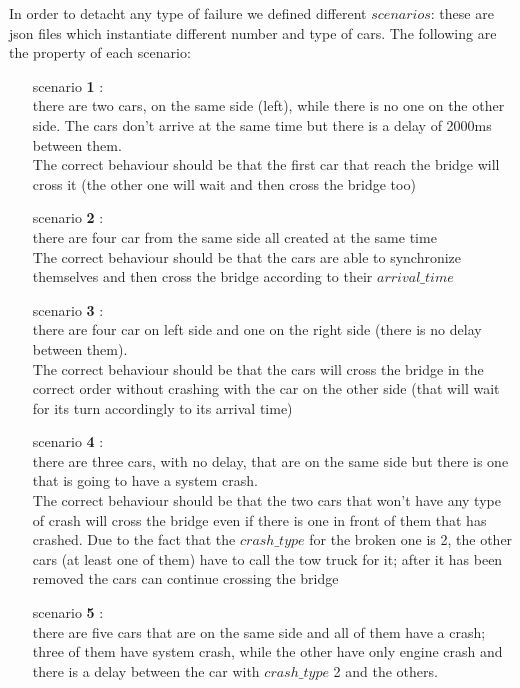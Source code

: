 In order to detacht any type of failure we defined different $scenarios$: these are json files which instantiate
different number and type of cars. The following are the property of each scenario:
\begin{itemize}
    \item[scenario \textbf{1}]: \\ there are two cars, on the same side (left), while there is no one on the other 
    side. The cars don't arrive at the same time but there is a delay of 2000ms between them. \\
    The correct behaviour should be that the first car that reach the bridge will cross it (the other 
    one will wait and then cross the bridge too) 
    \item[scenario \textbf{2}]: \\ there are four car from the same side all created at the same time \\The correct behaviour should be that 
    the cars are able to synchronize themselves and then cross the bridge according to their $arrival\_time$
    \item[scenario \textbf{3}]: \\ there are four car on left side and one on the right side (there is no delay 
    between them).\\ The correct behaviour should be that the cars will cross the bridge in the correct 
    order without crashing with the car on the other side (that will wait for its turn accordingly
    to its arrival time) 
    \item[scenario \textbf{4}]: \\ there are three cars, with no delay, that are on the same side but there is one that is going to
    have a system crash.\\ The correct behaviour should be that the two cars that won't have any type of crash
    will cross the bridge even if there is one in front of them that has crashed. Due to the fact that the 
    $crash\_type$ for the broken one is 2, the other cars (at least one of them) have to call the tow truck for 
    it; after it has been removed the cars can continue crossing the bridge
    \item[scenario \textbf{5}]: \\ there are five cars that are on the same side and all of them have a crash; three of them have system crash, 
    while the other have only engine crash and there is a delay between the car with $crash\_type$ 2 and the others.\\

\end{itemize}
